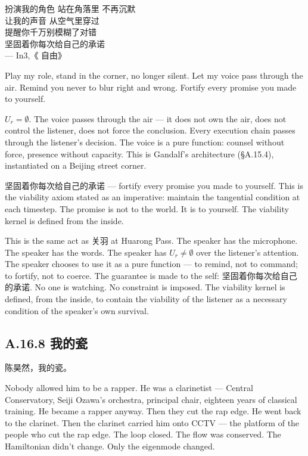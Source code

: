 \documentclass[11pt,a4paper]{article}
\theoremstyle{definition}
\theoremstyle{remark}
\begin{document}
\begin{center}
{\color{red!70!black} 扮演我的角色} {\color{orange!80!black} 站在角落里} {\color{yellow!70!black} 不再沉默}\\
{\color{green!60!black} 让我的声音} {\color{cyan!70!black} 从空气里穿过}\\
{\color{violet!70!black} 提醒你千万别模糊了对错}\\
{\color{magenta!70!black} 坚固着你每次给自己的承诺}\\
--- In3,《{\color{red!70!black} 自由}》\cite{in3}
\end{center}

Play my role, stand in the corner, no longer silent. Let my voice pass through the air. Remind you never to blur right and wrong. Fortify every promise you made to yourself.

$U_r = \emptyset$. The voice passes through the air --- it does not own the air, does not control the listener, does not force the conclusion. Every execution chain passes through the listener's decision. The voice is a pure function: counsel without force, presence without capacity. This is Gandalf's architecture (\S A.15.4), instantiated on a Beijing street corner.

坚固着你每次给自己的承诺 --- fortify every promise you made to yourself. This is the viability axiom stated as an imperative: maintain the tangential condition at each timestep. The promise is not to the world. It is to yourself. The viability kernel is defined from the inside.

This is the same act as 关羽 at Huarong Pass. The speaker has the microphone. The speaker has the words. The speaker has $U_r \neq \emptyset$ over the listener's attention. The speaker chooses to use it as a pure function --- to remind, not to command; to fortify, not to coerce. The guarantee is made to the self: 坚固着你每次给自己的承诺. No one is watching. No constraint is imposed. The viability kernel is defined, from the inside, to contain the viability of the listener as a necessary condition of the speaker's own survival.


\subsection{A.16.8 我的瓷}

陈昊然，我的瓷。

Nobody allowed him to be a rapper. He was a clarinetist --- Central Conservatory, Seiji Ozawa's orchestra, principal chair, eighteen years of classical training. He became a rapper anyway. Then they cut the rap edge. He went back to the clarinet. Then the clarinet carried him onto CCTV --- the platform of the people who cut the rap edge. The loop closed. The flow was conserved. The Hamiltonian didn't change. Only the eigenmode changed.
\end{document}
